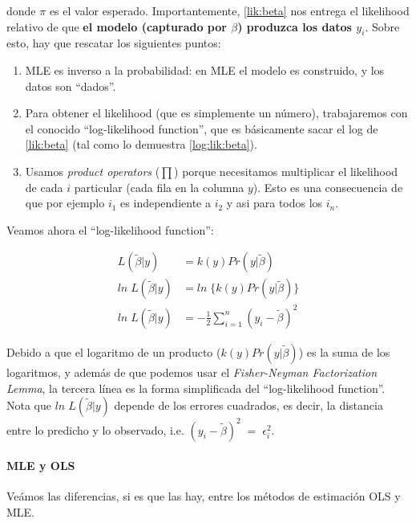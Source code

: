 \documentclass[onesided]{article}\usepackage[]{graphicx}\usepackage[]{color}
\begin{document}
donde $\pi$ es el valor esperado. Importantemente, \autoref{lik:beta} nos entrega el likelihood relativo de que {\bf el modelo (capturado por $\beta$) produzca los datos $y_{i}$}. Sobre esto, hay que rescatar los siguientes puntos:

\begin{enumerate}
  \item MLE es inverso a la probabilidad: en MLE el modelo es construido, y los datos son ``dados''. 
  \item Para obtener el likelihood (que es simplemente un n\'umero), trabajaremos con el conocido ``log-likelihood function'', que es b\'asicamente sacar el log de \autoref{lik:beta} (tal como lo demuestra \autoref{log:lik:beta}).
  \item Usamos \emph{product operators} ($\prod$) porque necesitamos multiplicar el likelihood de cada $i$ particular (cada fila en la columna $y$). Esto es una consecuencia de que por ejemplo $i_{1}$ es independiente a $i_{2}$ y asi para todos los $i_{n}$.
\end{enumerate}

Veamos ahora el ``log-likelihood function'':


\begin{equation} \label{log:lik:beta}
\begin{split}
L(\tilde{\beta}|y) & = k(y)Pr(y|\tilde{\beta})\\
ln \; L(\tilde{\beta}|y) & = ln \; \bigg\{  k(y)Pr(y|\tilde{\beta}) \bigg\} \\
ln \; L(\tilde{\beta}|y) & = -\frac{1}{2} \sum_{i=1}^{n}(y_{i}-\tilde{\beta})^{2}
\end{split}
\end{equation}

Debido a que el logaritmo de un producto ($k(y)Pr(y|\tilde{\beta})$) es la suma de los logaritmos, y adem\'as de que podemos usar el \emph{Fisher-Neyman Factorization Lemma}, la tercera l\'inea es la forma simplificada del ``log-likelihood function''. Nota que $ln \; L(\tilde{\beta}|y)$ depende de los errores cuadrados, es decir, la distancia entre lo predicho y lo observado, i.e. $(y_{i}-\tilde{\beta})^{2} \;=\; \epsilon^{2}_{i}$.

\paragraph{MLE y OLS} Ve\'amos las diferencias, si es que las hay, entre los m\'etodos de estimaci\'on OLS y MLE.
\end{document}

